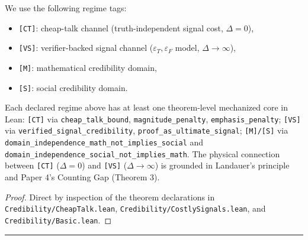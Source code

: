 We use the following regime tags:
\begin{itemize}
\item \texttt{[CT]}: cheap-talk channel (truth-independent signal cost, $\Delta = 0$),
\item \texttt{[VS]}: verifier-backed signal channel ($\varepsilon_T, \varepsilon_F$ model, $\Delta \to \infty$),
\item \texttt{[M]}: mathematical credibility domain,
\item \texttt{[S]}: social credibility domain.
\end{itemize}

\begin{proposition}\label{prop:credibility-regime-coverage}
Each declared regime above has at least one theorem-level mechanized core in Lean:
\texttt{[CT]} via \texttt{cheap\_talk\_bound}, \texttt{magnitude\_penalty}, \texttt{emphasis\_penalty};
\texttt{[VS]} via \texttt{verified\_signal\_credibility}, \texttt{proof\_as\_ultimate\_signal};
\texttt{[M]/[S]} via \texttt{domain\_independence\_math\_not\_implies\_social} and \texttt{domain\_independence\_social\_not\_implies\_math}.
The physical connection between \texttt{[CT]} ($\Delta=0$) and \texttt{[VS]} ($\Delta\to\infty$)
is grounded in Landauer's principle and Paper 4's Counting Gap (Theorem 3).
\end{proposition}

\begin{proof}
Direct by inspection of the theorem declarations in
\texttt{Credibility/CheapTalk.lean}, \texttt{Credibility/CostlySignals.lean}, and
\texttt{Credibility/Basic.lean}.
\end{proof}

\begin{center}\rule{0.5\linewidth}{0.5pt}\end{center}
